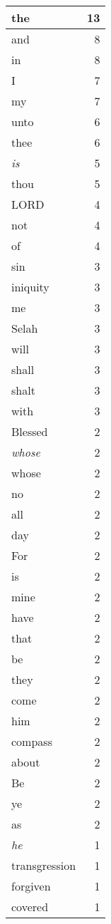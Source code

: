 \begin{center}
\begin{longtable}{l|r}
\hline \hline
\endlastfoot
the & 13 \\ \hline
and & 8 \\ \hline
in & 8 \\ \hline
I & 7 \\ \hline
my & 7 \\ \hline
unto & 6 \\ \hline
thee & 6 \\ \hline
\emph{is} & 5 \\ \hline
thou & 5 \\ \hline
LORD & 4 \\ \hline
not & 4 \\ \hline
of & 4 \\ \hline
sin & 3 \\ \hline
iniquity & 3 \\ \hline
me & 3 \\ \hline
Selah & 3 \\ \hline
will & 3 \\ \hline
shall & 3 \\ \hline
shalt & 3 \\ \hline
with & 3 \\ \hline
Blessed & 2 \\ \hline
\emph{whose} & 2 \\ \hline
whose & 2 \\ \hline
no & 2 \\ \hline
all & 2 \\ \hline
day & 2 \\ \hline
For & 2 \\ \hline
is & 2 \\ \hline
mine & 2 \\ \hline
have & 2 \\ \hline
that & 2 \\ \hline
be & 2 \\ \hline
they & 2 \\ \hline
come & 2 \\ \hline
him & 2 \\ \hline
compass & 2 \\ \hline
about & 2 \\ \hline
Be & 2 \\ \hline
ye & 2 \\ \hline
as & 2 \\ \hline
\emph{he} & 1 \\ \hline
transgression & 1 \\ \hline
forgiven & 1 \\ \hline
covered & 1 \\ \hline

\end{longtable}
\end{center}
